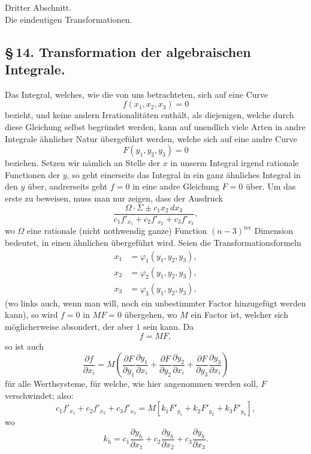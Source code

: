 \documentclass[10pt]{article}
\begin{document}

\begin{center}
{\large Dritter Abschnitt.}\\[0.35em]
{\Large Die eindeutigen Transformationen.}
\end{center}

\subsection*{\S\,14. Transformation der algebraischen Integrale.}

Das Integral, welches, wie die von uns betrachteten, sich auf eine Curve
\[
f(x_1,x_2,x_3)=0
\]
bezieht, und keine andern Irrationalitäten enthält, als diejenigen, welche durch diese Gleichung selbst begründet werden, kann auf unendlich viele Arten in andre Integrale ähnlicher Natur übergeführt werden, welche sich auf eine andre Curve
\[
F(y_1,y_2,y_3)=0
\]
beziehen. Setzen wir nämlich an Stelle der \(x\) in unserm Integral irgend rationale Functionen der \(y\), so geht einerseits das Integral in ein ganz ähnliches Integral in den \(y\) über, andrerseits geht \(f=0\) in eine andre Gleichung \(F=0\) über. Um das erste zu beweisen, muss man nur zeigen, dass der Ausdruck
\[
\frac{\Omega\cdot \Sigma\pm c_1x_2\,dx_3}
 {c_1f'_{x_1}+c_2f'_{x_2}+c_3f'_{x_3}},
\]
wo \(\Omega\) eine rationale (nicht nothwendig ganze) Function \((n-3)^{\text{ter}}\) Dimension bedeutet, in einen ähnlichen übergeführt wird. Seien die Transformationsformeln
\[
\tag{1}
\begin{aligned}
x_1&=\varphi_1(y_1,y_2,y_3),\\
x_2&=\varphi_2(y_1,y_2,y_3),\\
x_3&=\varphi_3(y_1,y_2,y_3),
\end{aligned}
\]
(wo links auch, wenn man will, noch ein unbestimmter Factor hinzugefügt werden kann), so wird \(f=0\) in \(MF=0\) übergehen, wo \(M\) ein Factor ist, welcher sich möglicherweise absondert, der aber \(1\) sein kann. Da
\[
f=MF,
\]
so ist auch
\[
\frac{\partial f}{\partial x_i}
=M\left(
\frac{\partial F}{\partial y_1}\frac{\partial y_1}{\partial x_i}
+\frac{\partial F}{\partial y_2}\frac{\partial y_2}{\partial x_i}
+\frac{\partial F}{\partial y_3}\frac{\partial y_3}{\partial x_i}
\right)
\]
für alle Werthsysteme, für welche, wie hier angenommen werden soll, \(F\) verschwindet; also:
\[
c_1f'_{x_1}+c_2f'_{x_2}+c_3f'_{x_3}
=M\left[k_1F'_{y_1}+k_2F'_{y_2}+k_3F'_{y_3}\right],
\]
wo
\[
k_h=c_1\frac{\partial y_h}{\partial x_1}
+c_2\frac{\partial y_h}{\partial x_2}
+c_3\frac{\partial y_h}{\partial x_3}.
\]
\end{document}
